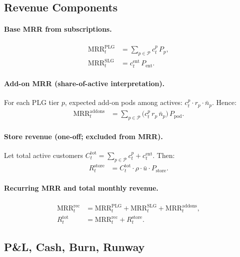 \documentclass[11pt, a4paper, oneside]{article}
\begin{document}
\subsection{Revenue Components}
\paragraph{Base MRR from subscriptions.}
\begin{align}
\mathrm{MRR}^{\mathrm{PLG}}_t &= \sum_{p \in \mathcal{P}} c^p_t \, P_p,\\
\mathrm{MRR}^{\mathrm{SLG}}_t &= c^{\mathrm{ent}}_t \, P_{\mathrm{ent}}.
\end{align}

\paragraph{Add-on MRR (share-of-active interpretation).}
For each PLG tier $p$, expected add-on pods among actives: $c^p_t \cdot r_p \cdot \bar{n}_p$. Hence:
\begin{align}
\mathrm{MRR}^{\mathrm{addons}}_t 
  &= \sum_{p \in \mathcal{P}} \bigl(c^p_t \, r_p \, \bar{n}_p\bigr)\, P_{\mathrm{pod}}.
\end{align}

\paragraph{Store revenue (one-off; excluded from MRR).}
Let total active customers $C^{\mathrm{tot}}_t = \sum_{p \in \mathcal{P}} c^p_t + c^{\mathrm{ent}}_t$. Then:
\begin{align}
R^{\mathrm{store}}_t 
  &= C^{\mathrm{tot}}_t \cdot \rho \cdot \bar{u} \cdot P_{\mathrm{store}}.
\end{align}

\paragraph{Recurring MRR and total monthly revenue.}
\begin{align}
\mathrm{MRR}^{\mathrm{rec}}_t 
  &= \mathrm{MRR}^{\mathrm{PLG}}_t + \mathrm{MRR}^{\mathrm{SLG}}_t + \mathrm{MRR}^{\mathrm{addons}}_t,\\
R^{\mathrm{tot}}_t 
  &= \mathrm{MRR}^{\mathrm{rec}}_t + R^{\mathrm{store}}_t.
\end{align}

\subsection{P\&L, Cash, Burn, Runway}
\end{document}
